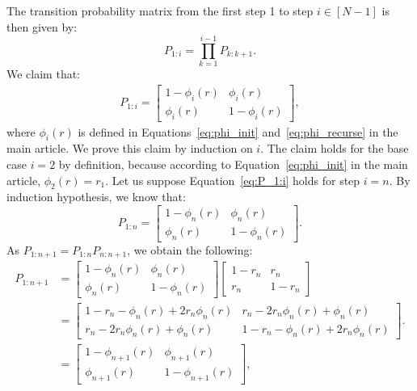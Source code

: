 \documentclass[12pt, a4paper, bibliography=totoc]{scrartcl}
\begin{document}
The transition probability matrix from the first step 1 to step $i \in [N-1]$ is then given by:
\[
P_{1:i}=\prod_{k=1}^{i-1} P_{k:k+1}.
\]
We claim that:
\begin{align}\label{eq:P_1:i}
 P_{1:i}=
\begin{bmatrix}
1-\phi_i(r)&\phi_i(r)\\
\phi_i(r)&1-\phi_i(r)
\end{bmatrix},   
\end{align}
where $\phi_i(r)$ is defined in Equations~\eqref{eq:phi_init} and~\eqref{eq:phi_recurse} in the main article. We prove this claim by induction on $i$.
The claim holds for the base case $i=2$ by definition, because according to Equation~\eqref{eq:phi_init} in the main article,  $\phi_2(r)=r_1$. 
Let us suppose Equation~\eqref{eq:P_1:i} holds for step $i=n$. By induction hypothesis, we know that:
\[
 P_{1:n}=
\begin{bmatrix}
1-\phi_{n}(r)&\phi_{n}(r)\\
\phi_{n}(r)&1-\phi_{n}(r)
\end{bmatrix}.
\]
As  
 $P_{1:n+1}=P_{1:n}P_{n:n+1}$, we obtain the following:
 \begin{align*}
    \nonumber P_{1:n+1}&=
     \begin{bmatrix}
    1-\phi_{n}(r)&\phi_{n}(r)\\
    \phi_{n}(r)&1-\phi_{n}(r)
    \end{bmatrix}
    \begin{bmatrix}
    1-r_n&r_n\\
    r_n&1-r_n
    \end{bmatrix}\\
    &=
    \begin{bmatrix}
    1-r_n-\phi_n(r)+2r_n\phi_n(r)&r_n-2r_n\phi_n(r)+\phi_n(r)\\
    r_n-2r_n\phi_n(r)+\phi_n(r)&1-r_n-\phi_n(r)+2r_n\phi_n(r)
    \end{bmatrix}.\\
    & = \begin{bmatrix}
1-\phi_{n+1}(r)&\phi_{n+1}(r)\\
\phi_{n+1}(r)&1-\phi_{n+1}(r)
\end{bmatrix},
    \label{eq:P_1:n+1_induction}
 \end{align*}
\end{document}
